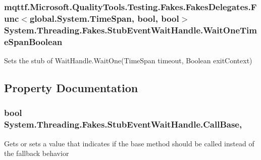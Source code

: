 \hypertarget{class_system_1_1_threading_1_1_fakes_1_1_stub_event_wait_handle_a8bef78f4f9b8a54a7d74310616b0247a}{
\subsubsection[{Wait\-One\-Time\-Span\-Boolean}]{\setlength{\rightskip}{0pt plus 5cm}mqttf.\-Microsoft.\-Quality\-Tools.\-Testing.\-Fakes.\-Fakes\-Delegates.\-Func$<$global.\-System.\-Time\-Span, bool, bool$>$ System.\-Threading.\-Fakes.\-Stub\-Event\-Wait\-Handle.\-Wait\-One\-Time\-Span\-Boolean}}\label{class_system_1_1_threading_1_1_fakes_1_1_stub_event_wait_handle_a8bef78f4f9b8a54a7d74310616b0247a}


Sets the stub of Wait\-Handle.\-Wait\-One(\-Time\-Span timeout, Boolean exit\-Context)



\subsection{Property Documentation}
\hypertarget{class_system_1_1_threading_1_1_fakes_1_1_stub_event_wait_handle_a7664175d85b4149d279f78854c1629ae}{
\subsubsection[{Call\-Base}]{\setlength{\rightskip}{0pt plus 5cm}bool System.\-Threading.\-Fakes.\-Stub\-Event\-Wait\-Handle.\-Call\-Base\hspace{0.3cm}{\ttfamily [get]}, {\ttfamily [set]}}}\label{class_system_1_1_threading_1_1_fakes_1_1_stub_event_wait_handle_a7664175d85b4149d279f78854c1629ae}


Gets or sets a value that indicates if the base method should be called instead of the fallback behavior

